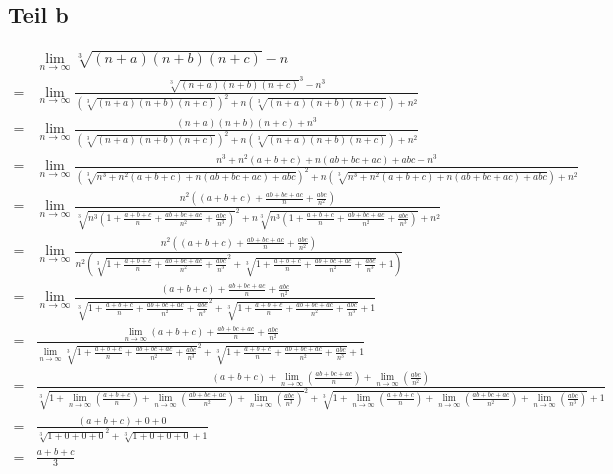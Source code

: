 \documentclass[a4paper,german,12pt,smallheadings]{scrartcl}
\begin{document}
\subsection*{Teil b}
\begin{landscape}
\begin{align*}
  &\lim_{n \to \infty} \sqrt[3]{(n+a)(n+b)(n+c)} - n \\
  = &\lim_{n \to \infty} \frac{\sqrt[3]{(n+a)(n+b)(n+c)}^3 - n^3}{\left(\sqrt[3]{(n+a)(n+b)(n+c)}\right)^2 + n\left(\sqrt[3]{(n+a)(n+b)(n+c)}\right) + n^2} \\
  = &\lim_{n \to \infty} \frac{(n+a)(n+b)(n+c) + n^3}{\left(\sqrt[3]{(n+a)(n+b)(n+c)}\right)^2 + n\left(\sqrt[3]{(n+a)(n+b)(n+c)}\right) + n^2} \\
  = &\lim_{n \to \infty} \frac{n^3 + n^2(a+b+c) + n(ab+bc+ac) + abc - n^3}{\left(\sqrt[3]{n^3 + n^2(a+b+c) + n(ab+bc+ac) + abc }\right)^2 + n\left(\sqrt[3]{n^3 + n^2(a+b+c) + n(ab+bc+ac) + abc }\right) + n^2} \\
  = &\lim_{n \to \infty} \frac{n^2\left((a+b+c) + \frac{ab+bc+ac}{n} + \frac{abc}{n^2}\right)}{\sqrt[3]{n^3 \left(1 + \frac{a+b+c}{n} + \frac{ab+bc+ac}{n^2} + \frac{abc}{n^3}\right)}^2 + n\sqrt[3]{n^3 \left(1 + \frac{a+b+c}{n} + \frac{ab+bc+ac}{n^2} + \frac{abc}{n^3}\right)} + n^2} \\
  = &\lim_{n \to \infty} \frac{n^2\left((a+b+c) + \frac{ab+bc+ac}{n} + \frac{abc}{n^2}\right)}{n^2\left(\sqrt[3]{1 + \frac{a+b+c}{n} + \frac{ab+bc+ac}{n^2} + \frac{abc}{n^3}}^2 + \sqrt[3]{1 + \frac{a+b+c}{n} + \frac{ab+bc+ac}{n^2} + \frac{abc}{n^3}} + 1\right)} \\
  = &\lim_{n \to \infty} \frac{(a+b+c) + \frac{ab+bc+ac}{n} + \frac{abc}{n^2}}{\sqrt[3]{1 + \frac{a+b+c}{n} + \frac{ab+bc+ac}{n^2} + \frac{abc}{n^3}}^2 + \sqrt[3]{1 + \frac{a+b+c}{n} + \frac{ab+bc+ac}{n^2} + \frac{abc}{n^3}} + 1} \\
  = &\frac{\lim_{n \to \infty} (a+b+c) + \frac{ab+bc+ac}{n} + \frac{abc}{n^2}}{\lim_{n \to \infty} \sqrt[3]{1 + \frac{a+b+c}{n} + \frac{ab+bc+ac}{n^2} + \frac{abc}{n^3}}^2 + \sqrt[3]{1 + \frac{a+b+c}{n} + \frac{ab+bc+ac}{n^2} + \frac{abc}{n^3}} + 1} \\
  = &\frac{(a+b+c) + \lim_{n \to \infty} \left(\frac{ab+bc+ac}{n}\right) + \lim_{n \to \infty}\left(\frac{abc}{n^2}\right)}{\sqrt[3]{1 + \lim_{n \to \infty} \left(\frac{a+b+c}{n}\right) + \lim_{n \to \infty} \left(\frac{ab+bc+ac}{n^2}\right) + \lim_{n \to \infty}\left(\frac{abc}{n^3}\right)}^2 + \sqrt[3]{1 + \lim_{n \to \infty} \left(\frac{a+b+c}{n}\right) + \lim_{n \to \infty} \left(\frac{ab+bc+ac}{n^2}\right) + \lim_{n \to \infty} \left(\frac{abc}{n^3}\right)} + 1} \\
  = &\frac{(a+b+c) + 0 + 0}{\sqrt[3]{1 + 0 + 0 + 0}^2 + \sqrt[3]{1 + 0 + 0 + 0} + 1} \\
  = &\frac{a+b+c}{3}
\end{align*}
\end{landscape}
\end{document}
